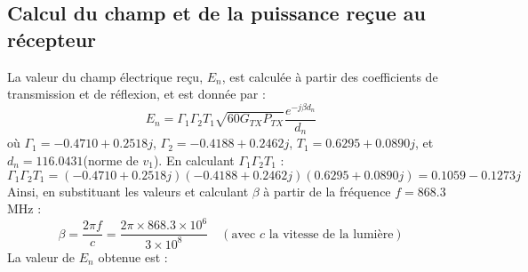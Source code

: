 \subsection{Calcul du champ et de la puissance reçue au récepteur}
La valeur du champ électrique reçu, $E_n$, est calculée à partir des coefficients de transmission et de réflexion, et est donnée par :
\[
E_n = \Gamma_1 \Gamma_2 T_1 \sqrt{60 G_{TX} P_{TX}} \frac{e^{-j \beta d_n}}{d_n}
\]
où $\Gamma_1 = -0.4710 + 0.2518j$, $\Gamma_2 = -0.4188 + 0.2462j$, $T_1 = 0.6295 + 0.0890j$, et $d_n = 116.0431$(norme de $v_1$). En calculant $\Gamma_1 \Gamma_2 T_1$ :
\[
\Gamma_1 \Gamma_2 T_1 = (-0.4710 + 0.2518j)(-0.4188 + 0.2462j)(0.6295 + 0.0890j) = 0.1059 - 0.1273j
\]
Ainsi, en substituant les valeurs et calculant $\beta$ à partir de la fréquence $f = 868.3$ MHz :
\[
\beta = \frac{2\pi f}{c} = \frac{2\pi \times 868.3 \times 10^6}{3 \times 10^8} \quad (\text{avec } c \text{ la vitesse de la lumière})
\]
La valeur de $E_n$ obtenue est :

